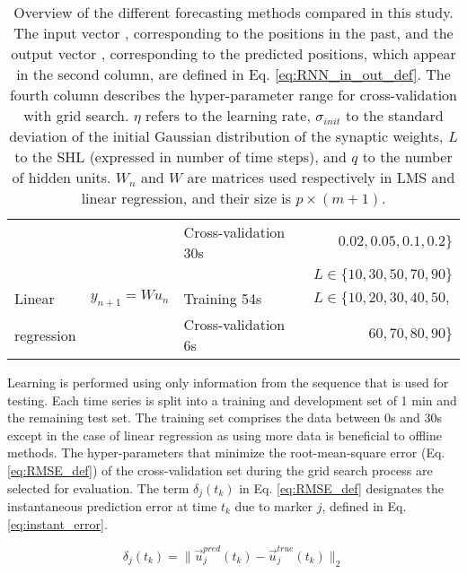 \documentclass[twocolumn,a4paper]{svjour3} \sloppy          \smartqed
\begin{document}
\begin{table*}[htb!]
\begin{center}
\begin{tabular}{llll}
              &                                             & Cross-validation 30s   & \multicolumn{1}{r}{$ 0.02, 0.05, 0.1, 0.2\}$}\\
              &                                             &                        & $L \in \{ 10, 30, 50, 70, 90\}$\\
\hline
Linear        & $y_{n+1} = W u_n$                           & Training 54s           & $L \in \{ 10, 20, 30, 40, 50, $ \\
regression    &                                             & Cross-validation 6s    & \multicolumn{1}{r}{$ 60, 70, 80, 90 \}$} \\
\hline
\end{tabular}
\end{center}
\caption{Overview of the different forecasting methods compared in this study. The input vector , corresponding to the positions in the past, and the output vector , corresponding to the predicted positions, which appear in the second column, are defined in Eq. \ref{eq:RNN_in_out_def}. The fourth column describes the hyper-parameter range for cross-validation with grid search.  $\eta$ refers to the learning rate, $\sigma_{init}$ to the standard deviation of the initial Gaussian distribution of the synaptic weights, $L$ to the SHL (expressed in number of time steps), and $q$ to the number of hidden units. $W_n$ and $W$ are matrices used respectively in LMS and linear regression, and their size is $p \times (m+1)$.}
\label{table:models comparison}
\end{table*}

Learning is performed using only information from the sequence that is used for testing. Each time series is split into a training and development set of 1 min and the remaining test set. The training set comprises the data between 0s and 30s except in the case of linear regression as using more data is beneficial to offline methods. The hyper-parameters that minimize the root-mean-square error (Eq. \ref{eq:RMSE_def}) of the cross-validation set during the grid search process are selected for evaluation. The term $\delta_j(t_k)$ in Eq. \ref{eq:RMSE_def} designates the instantaneous prediction error at time $t_k$ due to marker $j$, defined in Eq. \ref{eq:instant_error}.

\begin{equation} \label{eq:instant_error}
\delta_j(t_k) = \| \vec{u}_j^{pred}(t_k) - \vec{u}_j^{true}(t_k) \|_2
\end{equation}
\end{document}
